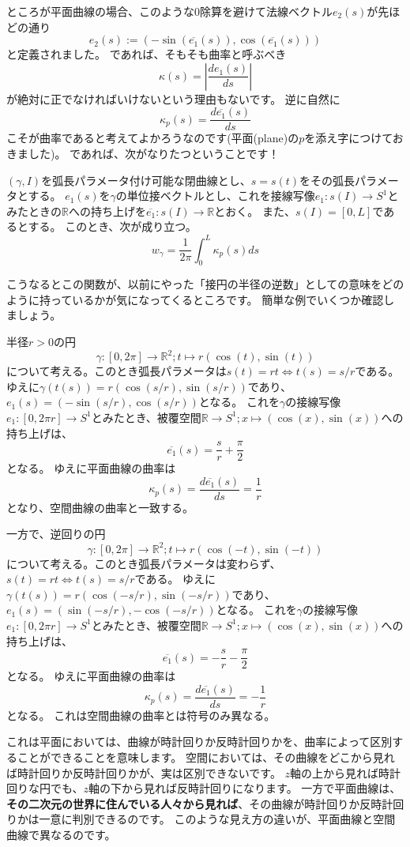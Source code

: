 ところが平面曲線の場合、このような0除算を避けて法線ベクトル$e_2(s)$が先ほどの通り
\[
  e_2(s):=(-\sin(\overline{e_1}(s)),\cos(\overline{e_1}(s)))
\]
と定義されました。
であれば、そもそも曲率と呼ぶべき
\[
  \kappa(s)=\left|\frac{de_1(s)}{ds}\right|
\]
が絶対に正でなければいけないという理由もないです。
逆に自然に
\[
  \kappa_p(s)=\frac{d\overline{e_1}(s)}{ds}
\]
こそが曲率であると考えてよかろうなのです(平面(plane)の$p$を添え字につけておきました)。
であれば、次がなりたつということです！
\begin{theorem}
  $(\gamma,I)$を弧長パラメータ付け可能な閉曲線とし、$s=s(t)$をその弧長パラメータとする。
  $e_1(s)$を$\gamma$の単位接ベクトルとし、これを接線写像$e_1:s(I)\to S^1$とみたときの$\mathbb{R}$への持ち上げを$\overline{e_1}:s(I)\to\mathbb{R}$とおく。
  また、$s(I)=[0,L]$であるとする。
  このとき、次が成り立つ。
  \[
    w_\gamma=\frac1{2\pi}\int_0^L\kappa_p(s)ds
  \]
\end{theorem}
こうなるとこの関数が、以前にやった「接円の半径の逆数」としての意味をどのように持っているかが気になってくるところです。
簡単な例でいくつか確認しましょう。

\begin{example}
  半径$r>0$の円
  \[
    \gamma:[0,2\pi]\to\mathbb{R}^2;t\mapsto r(\cos(t),\sin(t))
  \]
  について考える。このとき弧長パラメータは$s(t)=rt\Leftrightarrow t(s)=s/r$である。
  ゆえに$\gamma(t(s))=r(\cos(s/r),\sin(s/r))$であり、$e_1(s)=(-\sin(s/r),\cos(s/r))$となる。
  これを$\gamma$の接線写像$e_1:[0,2\pi r]\to S^1$とみたとき、被覆空間$\mathbb{R}\to S^1;x\mapsto(\cos(x),\sin(x))$への持ち上げは、
  \[
    \overline{e_1}(s)=\frac{s}{r}+\frac{\pi}{2}
  \]
  となる。
  ゆえに平面曲線の曲率は
  \[
    \kappa_p(s)=\frac{d\overline{e_1}(s)}{ds}=\frac{1}{r}
  \]
  となり、空間曲線の曲率と一致する。

  一方で、逆回りの円
  \[
    \gamma:[0,2\pi]\to\mathbb{R}^2;t\mapsto r(\cos(-t),\sin(-t))
  \]
  について考える。このとき弧長パラメータは変わらず、$s(t)=rt\Leftrightarrow t(s)=s/r$である。
  ゆえに$\gamma(t(s))=r(\cos(-s/r),\sin(-s/r))$であり、$e_1(s)=(\sin(-s/r),-\cos(-s/r))$となる。
  これを$\gamma$の接線写像$e_1:[0,2\pi r]\to S^1$とみたとき、被覆空間$\mathbb{R}\to S^1;x\mapsto(\cos(x),\sin(x))$への持ち上げは、
  \[
    \overline{e_1}(s)=-\frac{s}{r}-\frac{\pi}{2}
  \]
  となる。
  ゆえに平面曲線の曲率は
  \[
    \kappa_p(s)=\frac{d\overline{e_1}(s)}{ds}=-\frac{1}{r}
  \]
  となる。
  これは空間曲線の曲率とは符号のみ異なる。
\end{example}
これは平面においては、曲線が時計回りか反時計回りかを、曲率によって区別することができることを意味します。
空間においては、その曲線をどこから見れば時計回りか反時計回りかが、実は区別できないです。
$z$軸の上から見れば時計回りな円でも、$z$軸の下から見れば反時計回りになります。
一方で平面曲線は、\textbf{その二次元の世界に住んでいる人々から見れば}、その曲線が時計回りか反時計回りかは一意に判別できるのです。
このような見え方の違いが、平面曲線と空間曲線で異なるのです。

